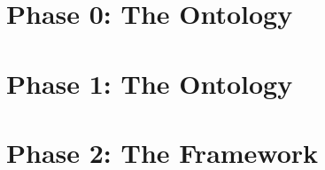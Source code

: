 \part{Phase 0: The \given Ontology}








\part{Phase 1: The \magoga Ontology}






\part{Phase 2: The \magoga Framework}
